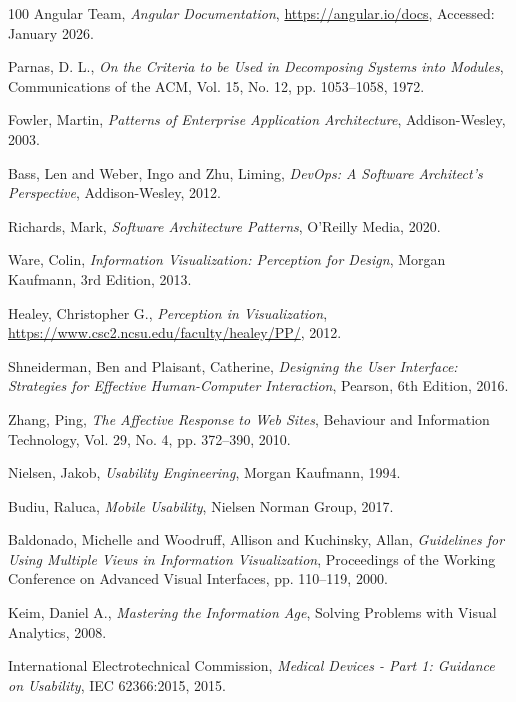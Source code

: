 \begin{thebibliography}{100}
  Angular Team,
  \textit{Angular Documentation},
  \url{https://angular.io/docs}, Accessed: January 2026.

  Parnas, D. L.,
  \textit{On the Criteria to be Used in Decomposing Systems into Modules},
  Communications of the ACM, Vol. 15, No. 12, pp. 1053--1058, 1972.

  Fowler, Martin,
  \textit{Patterns of Enterprise Application Architecture},
  Addison-Wesley, 2003.

  Bass, Len and Weber, Ingo and Zhu, Liming,
  \textit{DevOps: A Software Architect's Perspective},
  Addison-Wesley, 2012.

  Richards, Mark,
  \textit{Software Architecture Patterns},
  O'Reilly Media, 2020.

  Ware, Colin,
  \textit{Information Visualization: Perception for Design},
  Morgan Kaufmann, 3rd Edition, 2013.

  Healey, Christopher G.,
  \textit{Perception in Visualization},
  \url{https://www.csc2.ncsu.edu/faculty/healey/PP/}, 2012.

  Shneiderman, Ben and Plaisant, Catherine,
  \textit{Designing the User Interface: Strategies for Effective Human-Computer Interaction},
  Pearson, 6th Edition, 2016.

  Zhang, Ping,
  \textit{The Affective Response to Web Sites},
  Behaviour and Information Technology, Vol. 29, No. 4, pp. 372--390, 2010.

  Nielsen, Jakob,
  \textit{Usability Engineering},
  Morgan Kaufmann, 1994.

  Budiu, Raluca,
  \textit{Mobile Usability},
  Nielsen Norman Group, 2017.

  Baldonado, Michelle and Woodruff, Allison and Kuchinsky, Allan,
  \textit{Guidelines for Using Multiple Views in Information Visualization},
  Proceedings of the Working Conference on Advanced Visual Interfaces, pp. 110--119, 2000.

  Keim, Daniel A.,
  \textit{Mastering the Information Age},
  Solving Problems with Visual Analytics, 2008.

  International Electrotechnical Commission,
  \textit{Medical Devices - Part 1: Guidance on Usability},
  IEC 62366:2015, 2015.


\end{thebibliography}
